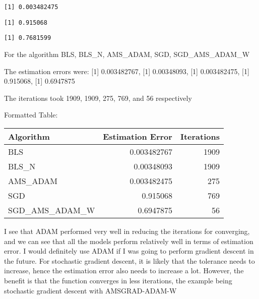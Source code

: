 \documentclass[
  letterpaper,
  DIV=11,
  numbers=noendperiod]{scrartcl}
\newenvironment{Shaded}{\begin{snugshade}}{\end{snugshade}}
\newcommand{\DecValTok}[1]{\textcolor[rgb]{0.68,0.00,0.00}{#1}}
\newcommand{\FunctionTok}[1]{\textcolor[rgb]{0.28,0.35,0.67}{#1}}
\newcommand{\NormalTok}[1]{\textcolor[rgb]{0.00,0.23,0.31}{#1}}
\newcommand{\SpecialCharTok}[1]{\textcolor[rgb]{0.37,0.37,0.37}{#1}}
\begin{document}
\begin{verbatim}
[1] 0.003482475
\end{verbatim}

\begin{Shaded}
\end{Shaded}

\begin{verbatim}
[1] 0.915068
\end{verbatim}

\begin{Shaded}
\end{Shaded}

\begin{verbatim}
[1] 0.7681599
\end{verbatim}

For the algorithm BLS, BLS\_N, AMS\_ADAM, SGD, SGD\_AMS\_ADAM\_W

The estimation errors were: {[}1{]} 0.003482767, {[}1{]} 0.00348093,
{[}1{]} 0.003482475, {[}1{]} 0.915068, {[}1{]} 0.6947875

The iterations took 1909, 1909, 275, 769, and 56 respectively

Formatted Table:

\begin{longtable}[]{@{}lrr@{}}
\toprule\noalign{}
Algorithm & Estimation Error & Iterations \\
\midrule\noalign{}
\endhead
\bottomrule\noalign{}
\endlastfoot
BLS & 0.003482767 & 1909 \\
BLS\_N & 0.00348093 & 1909 \\
AMS\_ADAM & 0.003482475 & 275 \\
SGD & 0.915068 & 769 \\
SGD\_AMS\_ADAM\_W & 0.6947875 & 56 \\
\end{longtable}

I see that ADAM performed very well in reducing the iterations for
converging, and we can see that all the models perform relatively well
in terms of estimation error. I would definitely use ADAM if I was going
to perform gradient descent in the future. For stochastic gradient
descent, it is likely that the tolerance needs to increase, hence the
estimation error also needs to increase a lot. However, the benefit is
that the function converges in less iterations, the example being
stochastic gradient descent with AMSGRAD-ADAM-W
\end{document}
